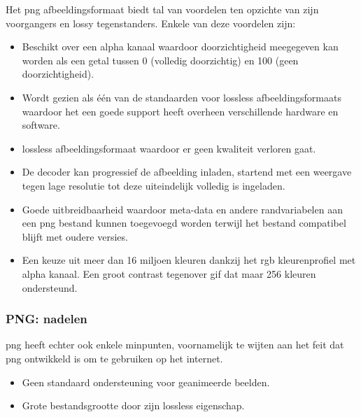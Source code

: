 Het \gls{png} \gls{afbeeldingsformaat} biedt tal van voordelen ten opzichte van zijn voorgangers en \gls{lossy} tegenstanders. Enkele van deze voordelen zijn:

\begin{itemize}
	\item Beschikt over een alpha kanaal waardoor doorzichtigheid meegegeven kan worden als een getal tussen 0 (volledig doorzichtig) en 100 (geen doorzichtigheid).
	
	\item Wordt gezien als één van de standaarden voor \gls{lossless} \glspl{afbeeldingsformaat} waardoor het een goede support heeft overheen verschillende hardware en software.
	
	\item \Gls{lossless} \gls{afbeeldingsformaat} waardoor er geen kwaliteit verloren gaat.
	
	\item De  \gls{decoder} kan progressief de afbeelding inladen, startend met een weergave tegen lage resolutie tot deze uiteindelijk volledig is ingeladen.
	
	\item Goede uitbreidbaarheid waardoor \gls{meta-data} en andere randvariabelen aan een \gls{png} bestand kunnen toegevoegd worden terwijl het bestand compatibel blijft met oudere versies.
	
	\item Een keuze uit meer dan 16 miljoen kleuren dankzij het \gls{rgb} kleurenprofiel met alpha kanaal. Een groot contrast tegenover \gls{gif} dat maar 256 kleuren ondersteund. 
\end{itemize}

\subsubsection{PNG: nadelen}
\label{sec:afbeeldingscompressie-png-nadelen}

\Gls{png} heeft echter ook enkele minpunten, voornamelijk te wijten aan het feit dat \gls{png} ontwikkeld is om te gebruiken op het internet.

\begin{itemize}
	\item Geen standaard ondersteuning voor geanimeerde beelden.
	
	\item Grote bestandsgrootte door zijn \gls{lossless} eigenschap.
\end{itemize}

